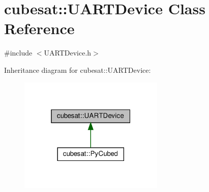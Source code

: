\hypertarget{classcubesat_1_1UARTDevice}{}\section{cubesat\+:\+:U\+A\+R\+T\+Device Class Reference}
\label{classcubesat_1_1UARTDevice}


{\ttfamily \#include $<$U\+A\+R\+T\+Device.\+h$>$}



Inheritance diagram for cubesat\+:\+:U\+A\+R\+T\+Device\+:\nopagebreak
\begin{figure}[H]
\begin{center}
\leavevmode
\includegraphics[width=196pt]{classcubesat_1_1UARTDevice__inherit__graph}
\end{center}
\end{figure}
